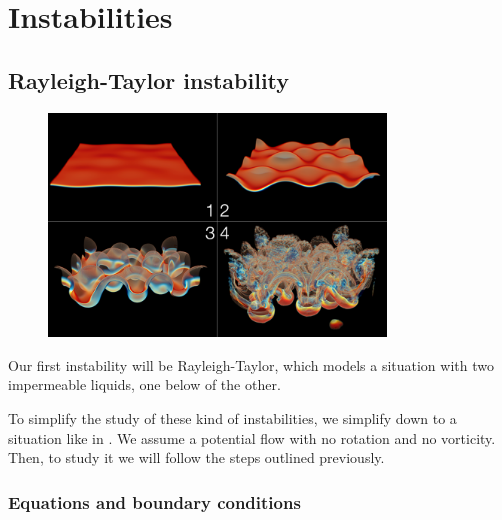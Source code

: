 \documentclass[palatino]{epflnotes}
\begin{document}
\chapter{Instabilities}

\section{Rayleigh-Taylor instability}

\begin{figure}[hbtp]
\begin{minipage}[b]{0.45\textwidth}
\centering
\includegraphics[width=0.8\textwidth]{img/RayleighTaylorInstability.png}
\label{fig:RayleighTaylorInterfaceImage}
\end{minipage}
\hfill
\begin{minipage}[b]{0.45\textwidth}
\label{fig:RayleighTaylorModel}
\end{minipage}
\end{figure}

Our first instability will be Rayleigh-Taylor, which models a situation with two impermeable liquids, one below of the other.

To simplify the study of these kind of instabilities, we simplify down to a situation like in . We assume a potential flow with no rotation and no vorticity. Then, to study it we will follow the steps outlined previously.

\subsection{Equations and boundary conditions}
\end{document}
